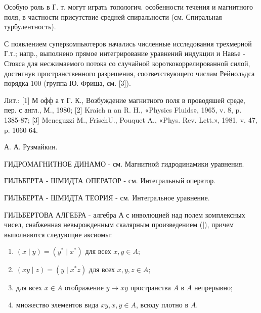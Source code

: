 \documentclass[10pt]{article}
\begin{document}
Особую роль в Г. т. могут играть топологич. особенности течения и магнитного поля, в частности присутствие средней спиральности (см. Спиральная турбулентность).



С появлением суперкомпьютеров начались численные исследования трехмерной Г.т.; напр., выполнено прямое интегрирование уравнений индукции и Навье - Стокса для несжимаемого потока со случайной короткокоррелированной силой, достигнув пространственного разрешения, соответствующего числам Рейнольдса порядка 100 (группа Ю. Фриша, см. [3]).



Лит.: [1] М офф а т Г. К., Возбуждение магнитного поля в проводяшей среде, пер. с англ., М., 1980; [2] Kraich n an R. H., «Physics Fluids», 1965, v. 8, p. 1385-87; [3] Meneguzzi M., FrischU., Pouquet A., «Phys. Rev. Lett.», 1981, v. 47, p. 1060-64.



А. А. Рузмайкин.



ГИДРОМАГНИТНОЕ ДИНАМО - см. Магнитной гидродинамики уравнения.



ГИЛЬБЕРТА - ШМИДТА OПЕРАТОР - см. Интегральный оператор.



ГИЛЬБЕРТА - ШМИДТА ТЕОРИЯ - см. Интегральное уравнение.



ГИЛЬБЕРТОВА АЛГЕБРА - алгебра $А$ с инволюцией над полем комплексных чисел, снабженная невырожденным скалярным произведением (|), причем выполняются следующие аксиомы:



\begin{enumerate}

  \item $(x \mid y)=\left(y^{*} \mid x^{*}\right)$ для всех $x, y \in A$;



  \item $(x y \mid z)=\left(y \mid x^{*} z\right)$ для всех $x, y, z \in A$;



  \item для всех $x \in A$ отображение $y \rightarrow x y$ пространства $A$ в $A$ непрерывно;



  \item множество элементов вида $x y, x, y \in A$, всюду плотно в $A$.



\end{enumerate}
\end{document}
